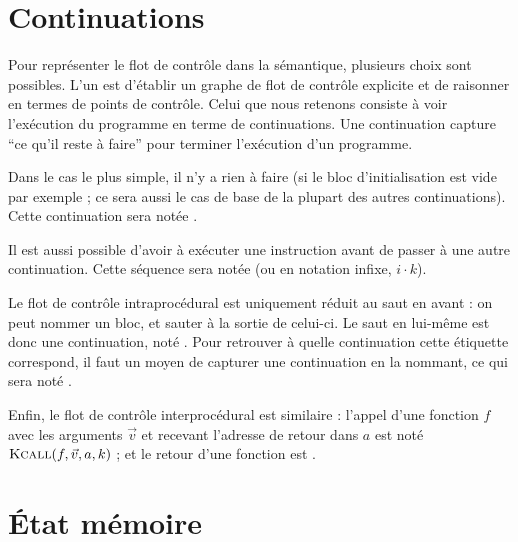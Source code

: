 \section{Continuations}
\label{sec:cont}

Pour représenter le flot de contrôle dans la sémantique, plusieurs choix sont
possibles. L'un est d'établir un graphe de flot de contrôle explicite et de
raisonner en termes de points de contrôle. Celui que nous retenons consiste à
voir l'exécution du programme en terme de continuations. Une continuation
capture ``ce qu'il reste à faire'' pour terminer l'exécution d'un programme.

Dans le cas le plus simple, il n'y a rien à faire (si le bloc d'initialisation
est vide par exemple ; ce sera aussi le cas de base de la plupart des autres
continuations). Cette continuation sera notée \kPass.

Il est aussi possible d'avoir à exécuter une instruction avant de passer à une
autre continuation. Cette séquence sera notée  (ou en notation
infixe, $i \cdot k$).

Le flot de contrôle intraprocédural est uniquement réduit au saut en avant : on
peut nommer un bloc, et sauter à la sortie de celui-ci. Le saut en lui-même est
donc une continuation, noté . Pour retrouver à quelle continuation
cette étiquette correspond, il faut un moyen de capturer une continuation en la
nommant, ce qui sera noté .

Enfin, le flot de contrôle interprocédural est similaire : l'appel d'une
fonction $f$ avec les arguments $\vec{v}$ et recevant l'adresse de retour dans
$a$ est noté $\textsc{Kcall}(f, \vec{v}, a, k)$ ; et le retour d'une fonction est
.


\section{État mémoire}
\label{sec:sigma}

